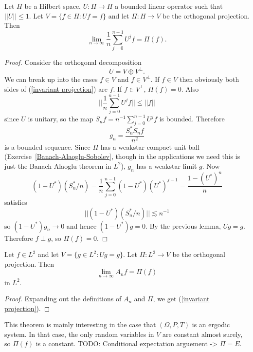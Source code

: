 \begin{lemma}
Let $H$ be a Hilbert space, $U: H \to H$ a bounded linear operator such that $||U|| \leq 1$.
Let $V = \{f \in H: Uf = f\}$ and let $\Pi: H \to V$ be the orthogonal projection. Then
\begin{equation}
\label{invariant projection}
\lim_{n \to \infty} \frac{1}{n} \sum_{j=0}^{n-1} U^jf = \Pi(f).
\end{equation}
\end{lemma}
\begin{proof}
Consider the orthogonal decomposition
\[U = V \oplus V^\perp.\]
We can break up into the cases $f \in V$ and $f \in V^\perp$.
If $f \in V$ then obviously both sides of (\ref{invariant projection}) are $f$.
If $f \in V^\perp$, $\Pi(f) = 0$.
Also
\[||\frac{1}{n} \sum_{j=0}^{n-1} U^jf|| \leq ||f||\]
since $U$ is unitary, so the map $S_{n}f = n^{-1} \sum_{j=0}^{n-1} U^jf$ is bounded.
Therefore
\[g_{n} = \frac{S_{n}^*S_{n}f}{n^2}\]
is a bounded sequence. Since $H$ has a weakstar compact unit ball (Exercise~\ref{Banach-Alaoglu-Sobolev}, though in the applications we need this is just the Banach-Alaoglu theorem in $L^2$), $g_{n}$ has a weakstar limit $g$.
Now
\[(1 - U^*)(S_{n}^*/n) = \frac{1}{n} \sum_{j=0}^{n-1} (1 - U^*)(U^*)^{j-1} = \frac{1 - (U^*)^n}{n}\]
satisfies
\[||(1 - U^*)(S_{n}^*/n)|| \lesssim n^{-1}\]
so $(1 - U^*)g_{n} \to 0$ and hence $(1 - U^*)g = 0$.
By the previous lemma, $Ug = g$. Therefore $f \perp g$, so $\Pi(f) = 0$.
\end{proof}

\begin{theorem}
Let $f \in L^2$ and let $V = \{g \in L^2: Ug = g\}$.
Let $\Pi: L^2 \to V$ be the orthogonal projection.
Then
\[\lim_{n \to \infty} A_{n}f = \Pi(f)\]
in $L^2$.
\end{theorem}
\begin{proof}
Expanding out the definitions of $A_{n}$ and $\Pi$, we get (\ref{invariant projection}).
\end{proof}

This theorem is mainly interesting in the case that $(\Omega, P, T)$ is an ergodic system.
In that case, the only random variables in $V$ are constant almost surely, so $\Pi(f)$ is a constant.
TODO: Conditional expectation arguement -> $\Pi = E$.

